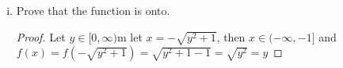 \documentclass[12pt]{amsart}
\begin{document}
\begin{enumerate}[{\bfseries 1.}]
\begin{enumerate}[(a)]
\begin{enumerate}[(i)]
			\begin{proof}
			Let $x_1, x_2\in (-\infty, -1]$ such that $f(x_1) = f(x_2)$, then we have $\sqrt{x_{1}^2 -1} = \sqrt{x_{2}^2 -1}$, square both sides, we have $x_{1}^2 = x_{2}^2 \Rightarrow x_1 = x_2$.
			\end{proof}
		\vspace{0.1in}
		\item Prove that the function is onto.
			\begin{proof}
			Let $y\in[0, \infty)$m let $x = -\sqrt{y^2 + 1}$, then $x\in(-\infty, -1]$ and $f(x) = f(-\sqrt{y^2 + 1}) = \sqrt{y^2 + 1 - 1} = \sqrt{y^2} = y$
			\end{proof}
		\end{enumerate}
	\end{enumerate}
\end{enumerate}
\end{document}
